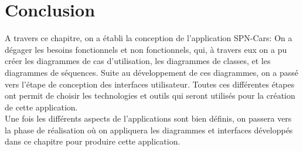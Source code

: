 \section*{Conclusion}
A travers ce chapitre, on a établi la conception de l'application SPN-Cars: On a dégager les besoins fonctionnels et non fonctionnels, qui, à travers eux on a pu créer les diagrammes de cas d'utilisation, les diagrammes de classes, et les diagrammes de séquences. Suite au développement de ces diagrammes, on a passé vers l'étape de conception des interfaces utilisateur. Toutes ces différentes étapes ont permit de choisir les technologies et outils qui seront utilisés pour la création de cette application.\\
Une fois les différents aspects de l'applications sont bien définis, on passera vers la phase de réalisation où on appliquera les diagrammes et interfaces développés dans ce chapitre pour produire cette application.